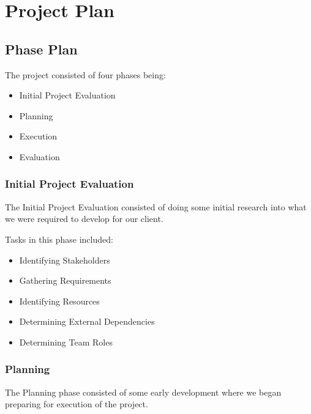
\section{Project Plan}


\subsection{Phase Plan}

The project consisted of four phases being:

\begin{itemize}
	\item Initial Project Evaluation
	\item Planning
	\item Execution
	\item Evaluation
\end{itemize}

\subsubsection{Initial Project Evaluation}

The Initial Project Evaluation consisted of doing some initial research into what we were required to develop for our client. 

Tasks in this phase included:
\begin{itemize}
	\item Identifying Stakeholders
	\item Gathering Requirements
	\item Identifying Resources
	\item Determining External Dependencies
	\item Determining Team Roles
\end{itemize}

\subsubsection{Planning}

The Planning phase consisted of some early development where we began preparing for execution of the project. 

